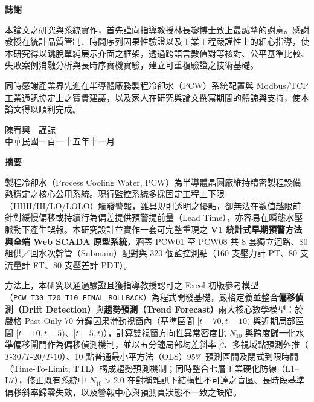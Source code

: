 \documentclass[fontset=none, a4paper, 12pt]{ctexart}
\begin{document}
\clearpage
{}
\pagestyle{empty}
\begin{center}
    \large\bfseries 誌謝
\end{center}
\vspace{0.5em}

本論文之研究與系統實作，首先謹向指導教授林長鋆博士致上最誠摯的謝意。感謝教授在統計品質管制、時間序列因果性驗證以及工業工程嚴謹性上的細心指導，使本研究得以跳脫單純展示介面之框架，透過跨語言數值對等核對、公平基準比較、失敗案例消融分析與長時序實機實驗，建立可重複驗證之技術基礎。

同時感謝產業界先進在半導體廠務製程冷卻水（PCW）系統配置與 Modbus/TCP 工業通訊協定上之寶貴建議，以及家人在研究與論文撰寫期間的體諒與支持，使本論文得以順利完成。

\vspace{2em}
\begin{flushright}
陳宥興　謹誌\\
中華民國一百一十五年十一月
\end{flushright}

\clearpage
\pagestyle{plain}
\setcounter{page}{1}

{}
\begin{center}
\large\bfseries 摘要
\end{center}
\vspace{0.5em}

製程冷卻水（Process Cooling Water, PCW）為半導體晶圓廠維持精密製程設備熱穩定之核心公用系統。現行監控系統多採固定工程上下限（HIHI/HI/LO/LOLO）觸發警報，雖具規則透明之優點，卻無法在數值越限前針對緩慢偏移或持續行為偏差提供預警提前量（Lead Time），亦容易在瞬態水壓脈動下產生誤報。本研究設計並實作一套可完整重現之 \textbf{V1 統計式早期預警方法與全端 Web SCADA 原型系統}，涵蓋 PCW01 至 PCW08 共 8 套獨立迴路、80 組供／回水次幹管（Submain）配對與 320 個監控測點（160 支壓力計 PT、80 支流量計 FT、80 支壓差計 PDT）。

方法上，本研究以通過驗證且獲指導教授認可之 Excel 初版參考模型（\texttt{PCW\_T30\_T20\_T10\_FINAL\_ROLLBACK}）為程式開發基礎，嚴格定義並整合\textbf{偏移偵測（Drift Detection）}與\textbf{趨勢預測（Trend Forecast）}兩大核心數學模型：於嚴格 Past-Only 70 分鐘因果滑動視窗內（基準區間 $[t-70, t-10)$ 與近期局部區間 $[t-10, t-5)$、$[t-5, t)$），計算雙視窗方向性異常密度比 $N_{10}$ 與跨度歸一化水準偏移閘門作為偏移偵測機制，並以五分鐘局部均差斜率 $\hat{\beta}$、多視域點預測外推（$T\text{-}30 / T\text{-}20 / T\text{-}10$）、10 點普通最小平方法（OLS）95\% 預測區間及閉式到限時間（Time-To-Limit, TTL）構成趨勢預測機制；同時整合七層工業硬化防線（L1–L7），修正既有系統中 $N_{10} > 2.0$ 在對稱雜訊下結構性不可達之盲區、長時段基準偏移斜率歸零失效，以及警報中心與預測頁狀態不一致之缺陷。
\end{document}
